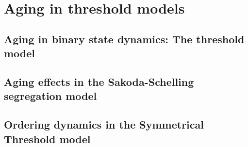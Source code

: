 \documentclass[
	11pt, %
	a4paper,
]{LegrandOrangeBook}
\begin{document}

\part{Aging in threshold models}

\chapterspaceabove{6.75cm}
\chapterspacebelow{7.25cm}

\chapter{Aging in binary state dynamics: The threshold model}


\chapterspaceabove{6.75cm}
\chapterspacebelow{7.25cm}

\chapter{Aging effects in the Sakoda-Schelling segregation model}


\chapterspaceabove{6.75cm}
\chapterspacebelow{7.25cm}

\chapter{Ordering dynamics in the Symmetrical Threshold model}


\chapterspaceabove{6.75cm}
\chapterspacebelow{7.25cm}
\end{document}
